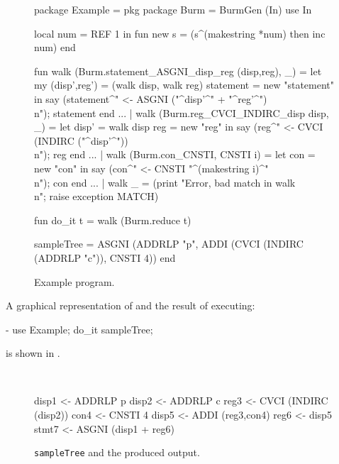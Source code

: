 \begin{figure}
\begin{centercode}
package Example = pkg 
  package Burm = BurmGen (In)
  use In

  local num = REF 1 in
    fun new s = (s^(makestring *num) then inc num)
  end

  fun walk (Burm.statement_ASGNI_disp_reg (disp,reg), _) =
        let
          my (disp',reg') = (walk disp, walk reg)
          statement = new "statement"
        in
          say (statement^" <- ASGNI ("^disp'^" + "^reg'^")\\n"); statement
        end
    ...
    | walk (Burm.reg_CVCI_INDIRC_disp disp, _) =
	let
	  disp' = walk disp
	  reg = new "reg"
	in
	  say (reg^" <- CVCI (INDIRC ("^disp'^"))\\n"); reg
	end
    ...
    | walk (Burm.con_CNSTI, CNSTI i) =
        let
          con = new "con"
        in
          say (con^" <- CNSTI "^(makestring i)^"\\n"); con
        end
    ...
    | walk _ = (print "Error, bad match in walk\\n"; raise exception MATCH)


  fun do_it t = walk (Burm.reduce t)

  sampleTree = ASGNI (ADDRLP "p",
                          ADDI (CVCI (INDIRC (ADDRLP "c")),
                                CNSTI 4))
end
\end{centercode}
 \caption{Example program.}
 \label{ex:prog}
\end{figure}

A graphical representation of  and the result of
executing: 
\begin{code}
    - use Example; do_it sampleTree;
\end{code}
is shown in .

\begin{figure}

\hspace*{\fill}
\hbox{
 \def\epsfsize#1#2{0.8#1}
}
\hspace*{\fill}

\vskip 1in

\begin{centercode}
disp1 <- ADDRLP p
disp2 <- ADDRLP c
reg3 <- CVCI (INDIRC (disp2))
con4 <- CNSTI 4
disp5 <- ADDI (reg3,con4)
reg6 <- disp5
stmt7 <- ASGNI (disp1 + reg6)
\end{centercode}
 \caption{{\tt sampleTree} and the produced output.}
 \label{ex:output}
\end{figure}

